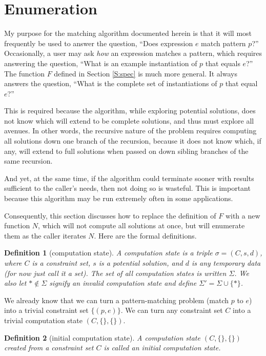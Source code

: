 \documentclass{article}
\newtheorem{dfn}{Definition}
\begin{document}
\section{Enumeration}%

My purpose for the matching algorithm documented herein is that it will most frequently be used to answer the question, ``Does expression $e$ match pattern $p$?''  Occasionally, a user may ask \emph{how} an expression matches a pattern, which requires answering the question, ``What is an example instantiation of $p$ that equals $e$?''  The function $F$ defined in Section \ref{S:spec} is much more general.  It always answers the question, ``What is the complete set of instantiations of $p$ that equal $e$?''

This is required because the algorithm, while exploring potential solutions, does not know which will extend to be complete solutions, and thus must explore all avenues.  In other words, the recursive nature of the problem requires computing all solutions down one branch of the recursion, because it does not know which, if any, will extend to full solutions when passed on down sibling branches of the same recursion.

And yet, at the same time, if the algorithm could terminate sooner with results sufficient to the caller's needs, then not doing so is wasteful.  This is important because this algorithm may be run extremely often in some applications.

Consequently, this section discusses how to replace the definition of $F$ with a new function $N$, which will not compute all solutions at once, but will enumerate them as the caller iterates $N$.  Here are the formal definitions.

\begin{dfn}[computation state]
A \emph{computation state} is a triple $\sigma=(C,s,d)$, where $C$ is a constraint set, $s$ is a potential solution, and $d$ is any temporary data (for now just call it a set).  The set of all computation states is written $\Sigma$.  We also let $*\notin\Sigma$ signify an invalid computation state and define $\Sigma'=\Sigma\cup\{*\}$.
\end{dfn}

We already know that we can turn a pattern-matching problem (match $p$ to $e$) into a trivial constraint set $\{(p,e)\}$.  We can turn any constraint set $C$ into a trivial computation state $(C,\{\},\{\})$.

\begin{dfn}[initial computation state]
A computation state $(C,\{\},\{\})$ created from a constraint set $C$ is called an \emph{initial computation state.}
\end{dfn}
\end{document}
